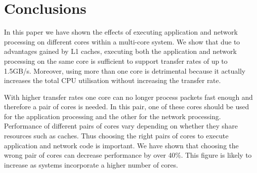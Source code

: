 \documentclass[conference, compsoc]{IEEEtran}
\begin{document}
\section{Conclusions}
\label{sect:conclusion}

In this paper we have shown the effects of executing application and network processing on different cores within a multi-core system. We show that due to advantages gained by L1 caches, executing both the application and network processing on the same core is sufficient to support transfer rates of up to 1.5GB/s. Moreover, using more than one core is detrimental because it actually increases the total CPU utilisation without increasing the transfer rate.

With higher transfer rates one core can no longer process packets fast enough and therefore a pair of cores is needed. In this pair, one of these cores should be used for the application processing and the other for the network processing. Performance of different pairs of cores vary depending on whether they share resources such as caches.  Thus choosing the right pairs of cores to execute application and network code is important.  We have shown that choosing the wrong pair of cores can decrease performance by over 40\%.  This figure is likely to increase as systems incorporate a higher number of cores.



\end{document}
